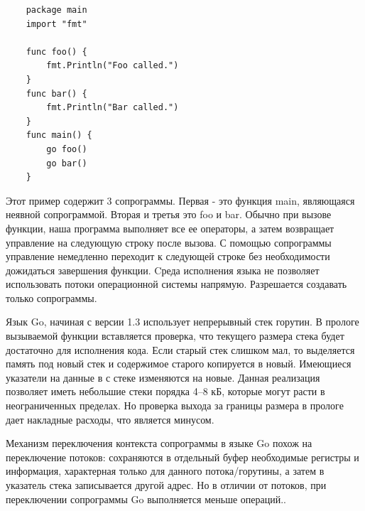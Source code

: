 	\begin{lstlisting}
	package main
	import "fmt"
	
	func foo() {
		fmt.Println("Foo called.")
	}
	func bar() {
		fmt.Println("Bar called.")
	}
	func main() {
		go foo()
		go bar()
	}

	\end{lstlisting}
		
	Этот пример содержит 3 сопрограммы. Первая - это функция main, являющаяся
	неявной сопрограммой. Вторая и третья это foo и bar. Обычно при вызове функции, наша программа 
	выполняет все ее операторы, а затем возвращает управление на следующую строку после вызова. 
	С помощью сопрограммы управление немедленно переходит к следующей строке без необходимости дожидаться завершения функции. Cреда исполнения языка не позволяет использовать потоки операционной системы
	напрямую. Разрешается создавать только сопрограммы.
	\par
	Язык Go, начиная с версии 1.3 использует непрерывный стек горутин. В прологе вызываемой функции вставляется проверка,
	что текущего размера стека будет достаточно для исполнения кода. Если старый стек слишком мал,
	то выделяется память под новый стек и содержимое старого копируется в новый. Имеющиеся указатели на
	данные в с стеке изменяются на новые. Данная реализация позволяет иметь небольшие стеки порядка 4--8 кБ, которые
	могут расти в неограниченных пределах. Но проверка выхода за границы размера в прологе дает накладные расходы,
	что является минусом. 
	\par 
	Механизм переключения контекста сопрограммы в языке Go похож на переключение потоков:
	сохраняются в отдельный буфер необходимые регистры и информация, характерная только для данного
	потока/горутины, а затем в указатель стека записывается другой адрес. Но в отличии от потоков, 
	при переключении сопрограммы Go выполняется меньше операций.\cite{go-context}.
	\clearpage
	

